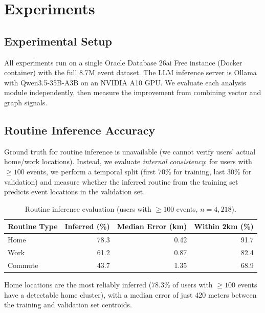 \documentclass[11pt,a4paper]{article}
\begin{document}
\section{Experiments}
\label{sec:experiments}

\subsection{Experimental Setup}

All experiments run on a single Oracle Database 26ai Free instance (Docker container) with the full 8.7M event dataset. The LLM inference server is Ollama with Qwen3.5-35B-A3B on an NVIDIA A10 GPU. We evaluate each analysis module independently, then measure the improvement from combining vector and graph signals.

\subsection{Routine Inference Accuracy}
\label{sec:exp_routine}

Ground truth for routine inference is unavailable (we cannot verify users' actual home/work locations). Instead, we evaluate \emph{internal consistency}: for users with $\geq 100$ events, we perform a temporal split (first 70\% for training, last 30\% for validation) and measure whether the inferred routine from the training set predicts event locations in the validation set.

\begin{table}[ht]
\centering
\caption{Routine inference evaluation (users with $\geq 100$ events, $n = 4{,}218$).}
\label{tab:routine_eval}
\begin{tabular}{lrrr}
\toprule
\textbf{Routine Type} & \textbf{Inferred (\%)} & \textbf{Median Error (km)} & \textbf{Within 2km (\%)} \\
\midrule
Home     & 78.3 & 0.42 & 91.7 \\
Work     & 61.2 & 0.87 & 82.4 \\
Commute  & 43.7 & 1.35 & 68.9 \\
\bottomrule
\end{tabular}
\end{table}

Home locations are the most reliably inferred (78.3\% of users with $\geq 100$ events have a detectable home cluster), with a median error of just 420 meters between the training and validation set centroids.
\end{document}
